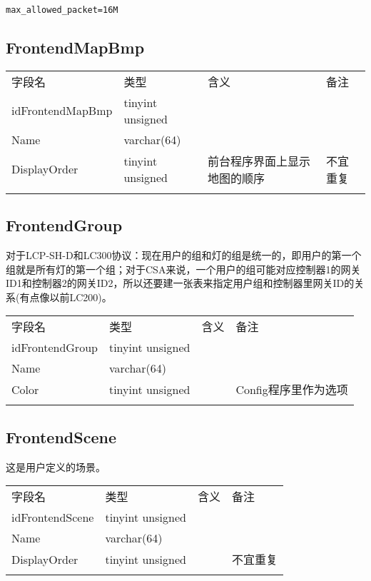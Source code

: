 \texttt{max\_allowed\_packet=16M}

\subsection{FrontendMapBmp}\label{frontendmapbmp}

\begin{longtabu}[c]{@{}lXXX@{}}
\toprule\addlinespace
字段名 & 类型 & 含义 & 备注
\\\addlinespace
\midrule\endhead
idFrontendMapBmp & tinyint unsigned & &
\\\addlinespace
Name & varchar(64) & &
\\\addlinespace
DisplayOrder & tinyint unsigned & 前台程序界面上显示地图的顺序 &
不宜重复
\\\addlinespace
\bottomrule
\end{longtabu}

\subsection{FrontendGroup}\label{frontendgroup}

对于LCP-SH-D和LC300协议：现在用户的组和灯的组是统一的，即用户的第一个组就是所有灯的第一个组；对于CSA来说，一个用户的组可能对应控制器1的网关ID1和控制器2的网关ID2，所以还要建一张表来指定用户组和控制器里网关ID的关系(有点像以前LC200)。

\begin{longtabu}[c]{@{}lXXX@{}}
\toprule\addlinespace
字段名 & 类型 & 含义 & 备注
\\\addlinespace
\midrule\endhead
idFrontendGroup & tinyint unsigned & &
\\\addlinespace
Name & varchar(64) & &
\\\addlinespace
Color & tinyint unsigned & & Config程序里作为选项
\\\addlinespace
\bottomrule
\end{longtabu}

\subsection{FrontendScene}\label{frontendscene}

这是用户定义的场景。

\begin{longtabu}[c]{@{}lXXX@{}}
\toprule\addlinespace
字段名 & 类型 & 含义 & 备注
\\\addlinespace
\midrule\endhead
idFrontendScene & tinyint unsigned & &
\\\addlinespace
Name & varchar(64) & &
\\\addlinespace
DisplayOrder & tinyint unsigned & & 不宜重复
\\\addlinespace
\bottomrule
\end{longtabu}

